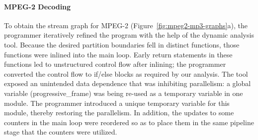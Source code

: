 


\paragraph*{MPEG-2 Decoding} To obtain the stream graph for MPEG-2
(Figure~\ref{fig:mpeg2-mp3-graphs}a), the programmer iteratively
refined the program with the help of the dynamic analysis tool.
Because the desired partition boundaries fell in distinct functions,
those functions were inlined into the main loop.  Early return
statements in these functions led to unstructured control flow after
inlining; the programmer converted the control flow to if/else blocks
as required by our analysis.  The tool exposed an unintended data
dependence that was inhibiting parallelism: a global variable
(progressive\_frame) was being re-used as a temporary variable in one
module.  The programmer introduced a unique temporary variable for
this module, thereby restoring the parallelism.  In addition, the
updates to some counters in the main loop were reordered so as to
place them in the same pipeline stage that the counters were utilized.

